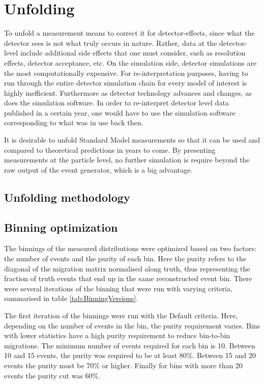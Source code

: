 \section{Unfolding}
\label{sec:unfolding}

To unfold a measurement means to correct it for detector-effects, since what the detector sees is not what truly occurs in nature. Rather, data at the detector-level include additional side effects that one must consider, such as resolution effects, detector acceptance, etc. On the simulation side, detector simulations are the most computationally expensive. For re-interpretation purposes, having to run through the entire detector simulation chain for every model of interest is highly inefficient. Furthermore as detector technology advances and changes, as does the simulation software. In order to re-interpret detector level data published in a certain year, one would have to use the simulation software corresponding to what was in use back then. 

It is desirable to unfold Standard Model measurements so that it can be used and compared to theoretical predictions in years to come. By presenting measurements at the particle level, no further simulation is require beyond the raw output of the event generator, which is a big advantage. 

\subsection{Unfolding methodology}
\label{subsec:unfmethod}

\subsection{Binning optimization}
\label{subsec:binningopt}

The binnings of the measured distributions were optimized based on two factors: the number of events and the purity of each bin. Here the purity refers to the diagonal of the migration matrix normalised along truth, thus representing the fraction of truth events that end up in the same reconstructed event bin. There were several iterations of the binning that were run with varying criteria, summarised in table \ref{tab:BinningVersions}.

The first iteration of the binnings were run with the Default criteria. Here, depending on the number of events in the bin, the purity requirement varies. Bins with lower statistics have a high purity requirement to reduce bin-to-bin migrations. The minimum number of events required for each bin is 10. Between 10 and 15 events, the purity was required to be at least 80\%. Between 15 and 20 events the purity must be 70\% or higher. Finally for bins with more than 20 events the purity cut was 60\%. 


